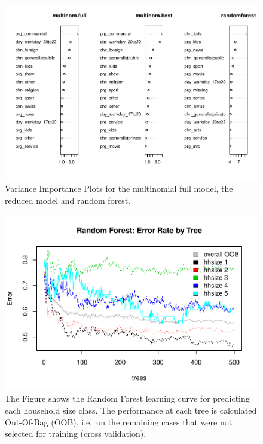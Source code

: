 \documentclass[]{article}
\begin{document}
\begin{figure}
\centering
\includegraphics{Diploma_files/figure-latex/unnamed-chunk-29-1.pdf}
\caption{\label{fig:fig9} Variance Importance Plots for the multinomial
full model, the reduced model and random forest.}
\end{figure}

\pagebreak

\begin{figure}
\centering
\includegraphics{Diploma_files/figure-latex/unnamed-chunk-30-1.pdf}
\caption{\label{fig:fig10} The Figure shows the Random Forest learning
curve for predicting each household size class. The performance at each
tree is calculated Out-Of-Bag (OOB), i.e.~on the remaining cases that
were not selected for training (cross validation).}
\end{figure}
\end{document}
